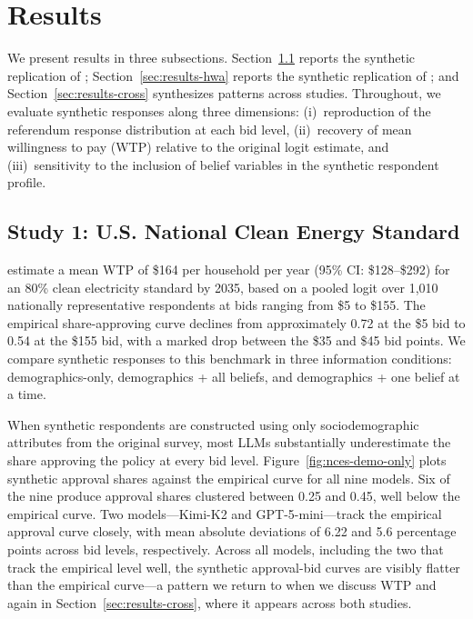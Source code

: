 \documentclass[12pt]{article}
\begin{document}
\section{Results}\label{sec:results}

We present results in three subsections. Section~\ref{sec:results-nces}
reports the synthetic replication of \textcite{Aldy2012};
Section~\ref{sec:results-hwa} reports the synthetic replication of
\textcite{Giguere2020}; and Section~\ref{sec:results-cross} synthesizes
patterns across studies. Throughout, we evaluate synthetic responses along
three dimensions: (i)~reproduction of the referendum response distribution
at each bid level, (ii)~recovery of mean willingness to pay (WTP) relative
to the original logit estimate, and (iii)~sensitivity to the inclusion of
belief variables in the synthetic respondent profile.

\subsection{Study 1: U.S. National Clean Energy Standard}\label{sec:results-nces}

\textcite{Aldy2012} estimate a mean WTP of \$164 per household per year
(95\% CI: \$128--\$292) for an 80\% clean electricity standard by 2035,
based on a pooled logit over 1{,}010 nationally representative respondents
at bids ranging from \$5 to \$155. The empirical share-approving curve
declines from approximately 0.72 at the \$5 bid to 0.54 at the \$155 bid,
with a marked drop between the \$35 and \$45 bid points. We compare
synthetic responses to this benchmark in three information conditions:
demographics-only, demographics + all beliefs, and demographics + one
belief at a time.

When synthetic respondents are constructed using only sociodemographic
attributes from the original survey, most LLMs substantially underestimate
the share approving the policy at every bid level.
Figure~\ref{fig:nces-demo-only} plots synthetic approval shares against
the empirical curve for all nine models. Six of the nine produce approval
shares clustered between 0.25 and 0.45, well below the empirical curve.
Two models---Kimi-K2 and GPT-5-mini---track the empirical approval curve
closely, with mean absolute deviations of 6.22 and
5.6 percentage points across bid levels, respectively. Across
all models, including the two that track the empirical level well, the
synthetic approval-bid curves are visibly flatter than the empirical
curve---a pattern we return to when we discuss WTP and again in
Section~\ref{sec:results-cross}, where it appears across both studies.
\end{document}
